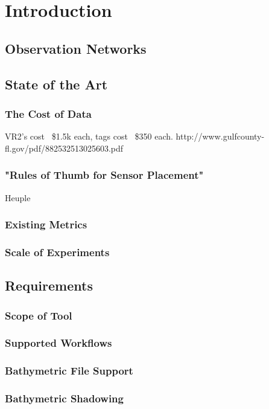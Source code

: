 \chapter{Introduction}

\section{Observation Networks}

\section{State of the Art}
\subsection{The Cost of Data}

VR2's cost ~\$1.5k each, tags cost ~\$350 each.  http://www.gulfcounty-fl.gov/pdf/882532513025603.pdf 


\subsection{"Rules of Thumb for Sensor Placement"}
Heuple 
\subsection{Existing Metrics}
\subsection{Scale of Experiments}

\section{Requirements}
\subsection{Scope of Tool}
\subsection{Supported Workflows}
\subsection{Bathymetric File Support}
\subsection{Bathymetric Shadowing}
